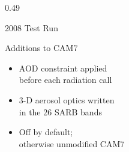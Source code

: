 \begin{frame}[t]
\begin{columns}[T]
\begin{column}{0.49\textwidth}
\begin{block}{2008 Test Run}
\end{block}
\begin{block}{Additions to CAM7}
\begin{itemize}
  \item AOD constraint applied\\before each radiation call
  \item 3-D aerosol optics written\\in the 26 SARB bands
  \item Off by default;\\otherwise unmodified CAM7
\end{itemize}
\end{block}
\end{column}
\end{columns}
\end{frame}
